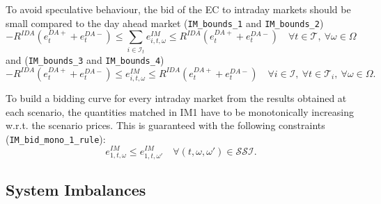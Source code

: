 \documentclass{article}
\begin{document}
To avoid speculative behaviour, the bid of the EC to intraday markets should be small compared to the day ahead market (\verb|IM_bounds_1| and \verb|IM_bounds_2|)
\begin{equation} \label{EQ:DM_IM_1}
	-R^{IDA} (e^{DA+}_{t} + e^{DA-}_{t})  \leq \sum_{i \in \mathcal{I}_t} e^{IM}_{i, t, \omega} \leq R^{IDA} (e^{DA+}_{t} + e^{DA-}_{t}) \quad \forall t \in \mathcal{T}, \ \forall \omega \in \Omega
\end{equation}
and (\verb|IM_bounds_3| and \verb|IM_bounds_4|)
\begin{equation} \label{EQ:IM_bounds_3-4}
	-R^{IDA} (e^{DA+}_{t} + e^{DA-}_{t}) \leq e^{IM}_{i, t, \omega} \leq R^{IDA} (e^{DA+}_{t} + e^{DA-}_{t}) \quad \forall i \in \mathcal{I}, \ \forall t \in \mathcal{T}_i, \ \forall \omega \in \Omega.
\end{equation}

To build a bidding curve for every intraday market from the results obtained at each scenario, the quantities matched in IM1 have to be monotonically increasing w.r.t. the scenario prices. This is guaranteed with the following constraints (\verb|IM_bid_mono_1_rule|):
\begin{equation} \label{EQ:lI_bid}
	e^{IM}_{1, t, \omega} \leq e^{IM}_{1, t, \omega'} \quad \forall (t, \omega, \omega') \in \mathcal{SSI}.
\end{equation}

\subsection{System Imbalances}
\end{document}
